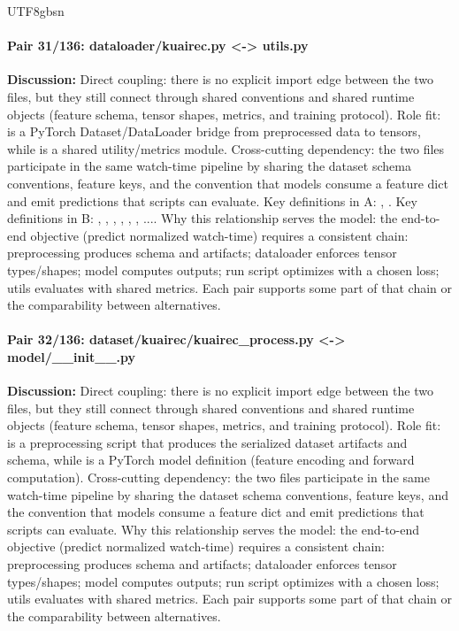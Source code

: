 \documentclass[11pt]{article}
\begin{document}
\begin{CJK*}{UTF8}{gbsn}
\paragraph{Pair 31/136: dataloader/kuairec.py <-> utils.py}
\textbf{Discussion:} Direct coupling: there is no explicit import edge between the two files, but they still connect through shared conventions and shared runtime objects (feature schema, tensor shapes, metrics, and training protocol). Role fit: \texttt{} is a PyTorch Dataset/DataLoader bridge from preprocessed data to tensors, while \texttt{} is a shared utility/metrics module. Cross-cutting dependency: the two files participate in the same watch-time pipeline by sharing the dataset schema conventions, feature keys, and the convention that models consume a feature dict and emit predictions that scripts can evaluate. Key definitions in A: \texttt{}, \texttt{}. Key definitions in B: \texttt{}, \texttt{}, \texttt{}, \texttt{}, \texttt{}, \texttt{}, .... Why this relationship serves the model: the end-to-end objective (predict normalized watch-time) requires a consistent chain: preprocessing produces schema and artifacts; dataloader enforces tensor types/shapes; model computes outputs; run script optimizes with a chosen loss; utils evaluates with shared metrics. Each pair supports some part of that chain or the comparability between alternatives.

\paragraph{Pair 32/136: dataset/kuairec/kuairec\_process.py <-> model/\_\_init\_\_.py}
\textbf{Discussion:} Direct coupling: there is no explicit import edge between the two files, but they still connect through shared conventions and shared runtime objects (feature schema, tensor shapes, metrics, and training protocol). Role fit: \texttt{} is a preprocessing script that produces the serialized dataset artifacts and schema, while \texttt{} is a PyTorch model definition (feature encoding and forward computation). Cross-cutting dependency: the two files participate in the same watch-time pipeline by sharing the dataset schema conventions, feature keys, and the convention that models consume a feature dict and emit predictions that scripts can evaluate. Why this relationship serves the model: the end-to-end objective (predict normalized watch-time) requires a consistent chain: preprocessing produces schema and artifacts; dataloader enforces tensor types/shapes; model computes outputs; run script optimizes with a chosen loss; utils evaluates with shared metrics. Each pair supports some part of that chain or the comparability between alternatives.


\end{CJK*}
\end{document}
